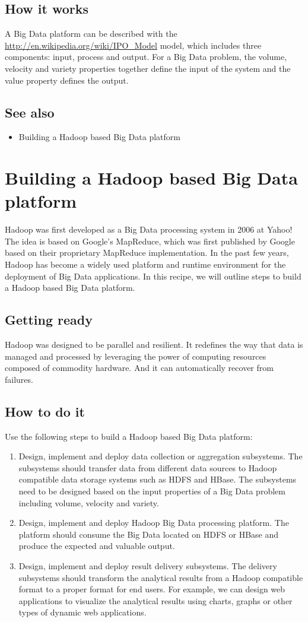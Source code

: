\subsection*{How it works}
A Big Data platform can be described with the \url{http://en.wikipedia.org/wiki/IPO_Model} model, which includes three components: input, process and output. For a Big Data problem, the volume, velocity and variety properties together define the input of the system and the value property defines the output.
\subsection*{See also}
\begin{itemize}
  \item Building a Hadoop based Big Data platform
\end{itemize}
\section{Building a Hadoop based Big Data platform}
Hadoop was first developed as a Big Data processing system in 2006 at Yahoo! The idea is based on Google's MapReduce, which was first published by Google based on their proprietary MapReduce implementation. In the past few years, Hadoop has become a widely used platform and runtime environment for the deployment of Big Data applications. In this recipe, we will outline steps to build a Hadoop based Big Data platform.
\subsection*{Getting ready}
Hadoop was designed to be parallel and resilient. It redefines the way that data is managed and processed by leveraging the power of computing resources composed of commodity hardware. And it can automatically recover from failures.
\subsection*{How to do it}
Use the following steps to build a Hadoop based Big Data platform:
\begin{enumerate}
  \item Design, implement and deploy data collection or aggregation subsystems. The subsystems should transfer data from different data sources to Hadoop compatible data storage systems such as HDFS and HBase. The subsystems need to be designed based on the input properties of a Big Data problem including volume, velocity and variety.
  \item Design, implement and deploy Hadoop Big Data processing platform. The platform should consume the Big Data located on HDFS or HBase and produce the expected and valuable output.
  \item Design, implement and deploy result delivery subsystems. The delivery subsystems should transform the analytical results from a Hadoop compatible format to a proper format for end users. For example, we can design web applications to visualize the analytical results using charts, graphs or other types of dynamic web applications.
\end{enumerate}
